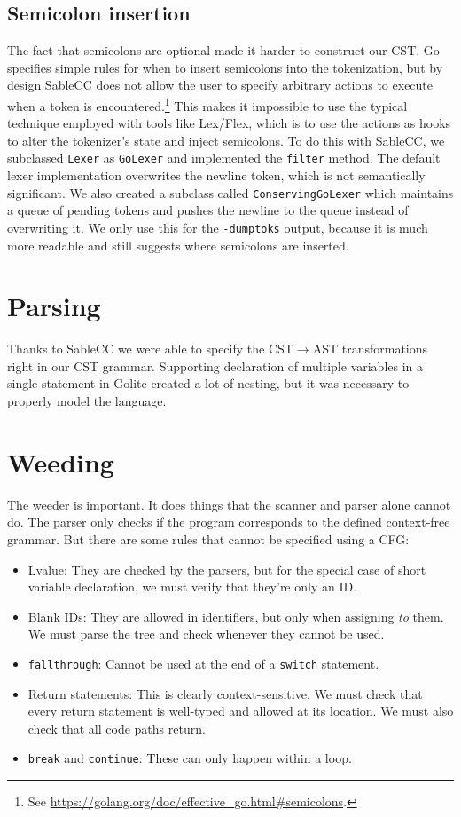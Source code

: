 \documentclass[oneside]{article}
\begin{document}
\subsection{Semicolon insertion}\label{subsec:semicolons}
The fact that semicolons are optional made it harder to construct our CST. Go specifies simple rules for when to insert semicolons into the tokenization, but by design SableCC does not allow the user to specify arbitrary actions to execute when a token is encountered.\footnote{See \url{https://golang.org/doc/effective_go.html\#semicolons}.} This makes it impossible to use the typical technique employed with tools like Lex/Flex, which is to use the actions as hooks to alter the tokenizer's state and inject semicolons. To do this with SableCC, we subclassed \verb|Lexer| as \verb|GoLexer| and implemented the \verb|filter| method. The default lexer implementation overwrites the newline token, which is not semantically significant. We also created a subclass called \texttt{ConservingGoLexer} which maintains a queue of pending tokens and pushes the newline to the queue instead of overwriting it. We only use this for the \texttt{-dumptoks} output, because it is much more readable and still suggests where semicolons are inserted.

\section{Parsing}

Thanks to SableCC we were able to specify the CST$\rightarrow$AST transformations right in our CST grammar. Supporting declaration of multiple variables in a single statement in Golite created a lot of nesting, but it was necessary to properly model the language.

\section{Weeding}

The weeder is important. It does things that the scanner and parser alone cannot do. The parser only checks if the program corresponds to the defined context-free grammar. But there are some rules that cannot be specified using a CFG:
\begin{itemize}
\item Lvalue: They are checked by the parsers, but for the special case of short variable declaration, we must verify that they're only an ID.
\item Blank IDs: They are allowed in identifiers, but only when assigning \textit{to} them. We must parse the tree and check whenever they cannot be used.
\item \verb|fallthrough|: Cannot be used at the end of a \verb|switch| statement.
\item Return statements: This is clearly context-sensitive. We must check that every return statement is well-typed and allowed at its location. We must also check that all code paths return.
\item \verb|break| and \verb|continue|: These can only happen within a loop.
\end{itemize}
\end{document}
